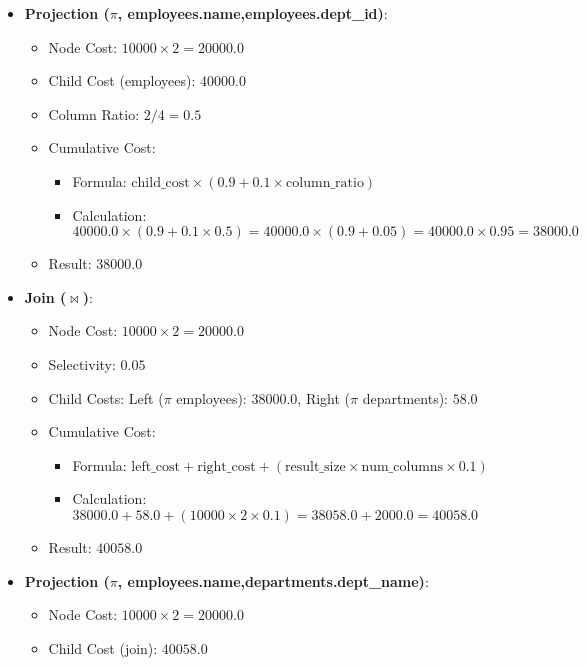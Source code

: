 \documentclass[12pt,a4paper]{article}
\begin{document}
\begin{itemize}
    \item \textbf{Projection ($\pi$, employees.name,employees.dept\_id)}:
        \begin{itemize}
            \item Node Cost: $10000 \times 2 = 20000.0$
            \item Child Cost (employees): $40000.0$
            \item Column Ratio: $2 / 4 = 0.5$
            \item Cumulative Cost:
                \begin{itemize}
                    \item Formula: $\text{child\_cost} \times (0.9 + 0.1 \times \text{column\_ratio})$
                    \item Calculation: $40000.0 \times (0.9 + 0.1 \times 0.5) = 40000.0 \times (0.9 + 0.05) = 40000.0 \times 0.95 = 38000.0$
                \end{itemize}
            \item Result: $38000.0$
        \end{itemize}
    \item \textbf{Join ($\bowtie$)}:
        \begin{itemize}
            \item Node Cost: $10000 \times 2 = 20000.0$
            \item Selectivity: $0.05$
            \item Child Costs: Left ($\pi$ employees): $38000.0$, Right ($\pi$ departments): $58.0$
            \item Cumulative Cost:
                \begin{itemize}
                    \item Formula: $\text{left\_cost} + \text{right\_cost} + (\text{result\_size} \times \text{num\_columns} \times 0.1)$
                    \item Calculation: $38000.0 + 58.0 + (10000 \times 2 \times 0.1) = 38058.0 + 2000.0 = 40058.0$
                \end{itemize}
            \item Result: $40058.0$
        \end{itemize}
    \item \textbf{Projection ($\pi$, employees.name,departments.dept\_name)}:
        \begin{itemize}
            \item Node Cost: $10000 \times 2 = 20000.0$
            \item Child Cost (join): $40058.0$

\end{itemize}
\end{itemize}
\end{document}
